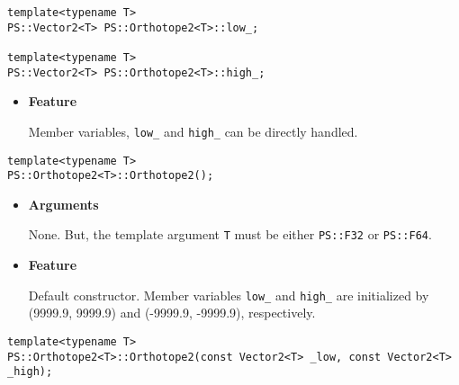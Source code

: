 
\begin{screen}
\begin{verbatim}
template<typename T>
PS::Vector2<T> PS::Orthotope2<T>::low_;

template<typename T>
PS::Vector2<T> PS::Orthotope2<T>::high_;
\end{verbatim}
\end{screen}

\begin{itemize}
  
\item{{\bf Feature}}
  
Member variables, \texttt{low\_} and \texttt{high\_} can be directly handled.
  
\end{itemize}


\begin{screen}
\begin{verbatim}
template<typename T>
PS::Orthotope2<T>::Orthotope2();
\end{verbatim}
\end{screen}

\begin{itemize}

\item{{\bf Arguments}}

None. But, the template argument \texttt{T} must be either \texttt{PS::F32} or \texttt{PS::F64}.

\item{{\bf Feature}}

Default constructor.
Member variables \texttt{low\_} and \texttt{high\_} are initialized by (9999.9, 9999.9) and (-9999.9, -9999.9), respectively.

\end{itemize}
\begin{screen}
\begin{verbatim}
template<typename T>
PS::Orthotope2<T>::Orthotope2(const Vector2<T> _low, const Vector2<T> _high);
\end{verbatim}
\end{screen}

